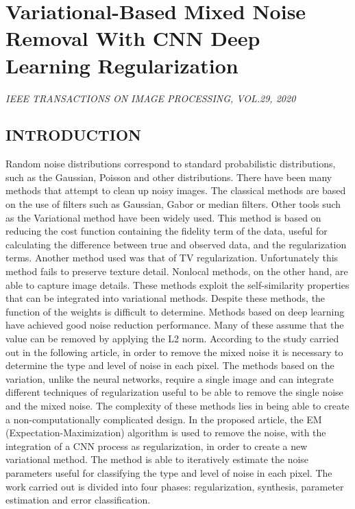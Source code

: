 \section{Variational-Based Mixed Noise Removal With CNN Deep Learning Regularization}

\begin{center}
    \author{
    Faqiang Wang,
    Haiyang Huang,
    Jun Liu
    }
\end{center}

\begin{center}
    \emph{IEEE TRANSACTIONS ON IMAGE PROCESSING, VOL.29, 2020}
\end{center}

\subsection{INTRODUCTION}
Random noise distributions correspond to standard probabilistic distributions, such as the Gaussian, Poisson and other distributions. There have been many methods that attempt to clean up noisy images. The classical methods are based on the use of filters such as Gaussian, Gabor or median filters. Other tools such as the Variational method have been widely used. This method is based on reducing the cost function containing the fidelity term of the data, useful for calculating the difference between true and observed data, and the regularization terms. Another method used was that of TV regularization. Unfortunately this method fails to preserve texture detail. Nonlocal methods, on the other hand, are able to capture image details. These methods exploit the self-similarity properties that can be integrated into variational methods. Despite these methods, the function of the weights is difficult to determine. Methods based on deep learning have achieved good noise reduction performance. Many of these assume that the value can be removed by applying the L2 norm. According to the study carried out in the following article, in order to remove the mixed noise it is necessary to determine the type and level of noise in each pixel. The methods based on the variation, unlike the neural networks, require a single image and can integrate different techniques of regularization useful to be able to remove the single noise and the mixed noise. The complexity of these methods lies in being able to create a non-computationally complicated design. In the proposed article, the EM (Expectation-Maximization) algorithm is used to remove the noise, with the integration of a CNN process as regularization, in order to create a new variational method. The method is able to iteratively estimate the noise parameters useful for classifying the type and level of noise in each pixel. The work carried out is divided into four phases: regularization, synthesis, parameter estimation and error classification.